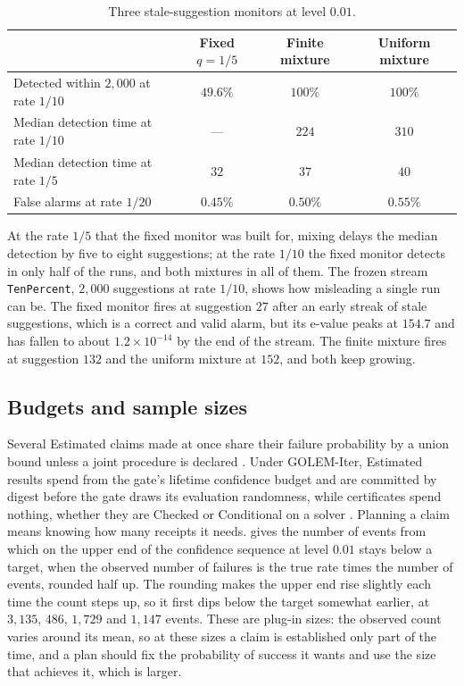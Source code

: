 \documentclass[11pt]{article}
\newcommand{\code}[1]{\texttt{#1}}
\theoremstyle{definition}
\theoremstyle{plain}
\begin{document}
\begin{table}[ht]
\centering\small
\begin{tabular}{lccc}
\toprule
 & Fixed $q=1/5$ & Finite mixture & Uniform mixture\\
\midrule
Detected within $2{,}000$ at rate $1/10$ & $49.6\%$ & $100\%$ & $100\%$\\
Median detection time at rate $1/10$ & --- & $224$ & $310$\\
Median detection time at rate $1/5$ & $32$ & $37$ & $40$\\
False alarms at rate $1/20$ & $0.45\%$ & $0.50\%$ & $0.55\%$\\
\bottomrule
\end{tabular}
\caption{Three stale-suggestion monitors at level $0.01$.}\label{tab:monitors}
\end{table}

At the rate $1/5$ that the fixed monitor was built for, mixing delays the median detection by five
to eight suggestions; at the rate $1/10$ the fixed monitor detects in only half of the runs, and
both mixtures in all of them. The frozen stream \code{TenPercent}, $2{,}000$ suggestions at rate
$1/10$, shows how misleading a single run can be. The fixed monitor fires at suggestion $27$ after
an early streak of stale suggestions, which is a correct and valid alarm, but its e-value peaks at
$154.7$ and has fallen to about $1.2\times 10^{-14}$ by the end of the stream. The finite mixture
fires at suggestion $132$ and the uniform mixture at $152$, and both keep growing.

\subsection{Budgets and sample sizes}\label{sec:budgets}

Several Estimated claims made at once share their failure probability by a union bound unless a
joint procedure is declared \cite[Section~7.4]{spec}. Under GOLEM-Iter, Estimated results spend
from the gate's lifetime confidence budget and are committed by digest before the gate draws its
evaluation randomness, while certificates spend nothing, whether they are Checked or Conditional on
a solver \cite[Section~12.3]{part1}. Planning a
claim means knowing how many receipts it needs.  gives the number of events from
which on the upper end of the confidence sequence at level $0.01$ stays below a target, when the
observed number of failures is the true rate times the number of events, rounded half up. The
rounding makes the upper end rise slightly each time the count steps up, so it first dips below the
target somewhat earlier, at $3{,}135$, $486$, $1{,}729$ and $1{,}147$ events. These are plug-in
sizes: the observed count varies around its mean, so at these sizes a claim is established only part
of the time, and a plan should fix the probability of success it wants and use the size that
achieves it, which is larger.
\end{document}
